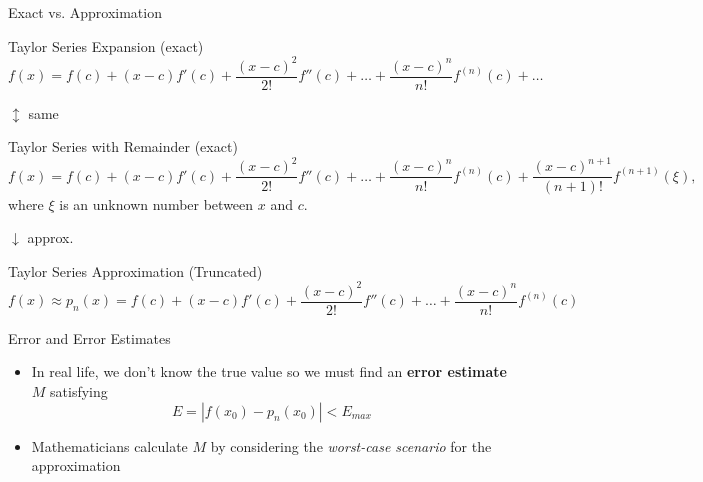 \documentclass[10pt]{beamer}
\begin{document}
\begin{frame}[shrink]{Exact vs. Approximation}
\begin{block}{Taylor Series Expansion (exact)}
\begin{equation*}
    f(x) = f(c) + (x-c) f'(c) + \frac{(x-c)^2}{2!} f''(c) + \dots +
\frac{(x-c)^n}{n!} f^{(n)}(c)+\dots
\end{equation*}
\end{block}
\begin{center} 
$\updownarrow$ same
\end{center} \vspace{-2mm}
\begin{block}{Taylor Series with Remainder (exact)}
\begin{equation*}
    f(x) = f(c) + (x-c) f'(c) + \frac{(x-c)^2}{2!} f''(c) + \dots + \frac{(x-c)^n}{n!} f^{(n)}(c) + \frac{(x-c)^{n+1}}{(n+1)!} f^{(n+1)}(\xi),
\end{equation*}
where $\xi$ is an unknown number between $x$ and $c$.
\end{block}
\begin{center} 
$\downarrow$ approx.
\end{center}\vspace{-2mm}
\begin{block}{Taylor Series Approximation (Truncated)}
\begin{equation*}
   f(x) \approx  p_n(x) = f(c) + (x-c) f'(c) + \frac{(x-c)^2}{2!} f''(c) + \dots +
\frac{(x-c)^n}{n!} f^{(n)}(c)
\end{equation*}
\end{block}
\end{frame}
\begin{frame}{Error and Error Estimates}


\begin{itemize}
    \item In real life, we don't know the true value so we must find an \textbf{error estimate} $M$ satisfying 
        $$ E = \left| f(x_0) - p_n(x_0)\right| < E_{max} $$

    \item Mathematicians calculate $M$ by considering the \textit{worst-case scenario} for the approximation
\end{itemize}
    
\end{frame}
\end{document}
